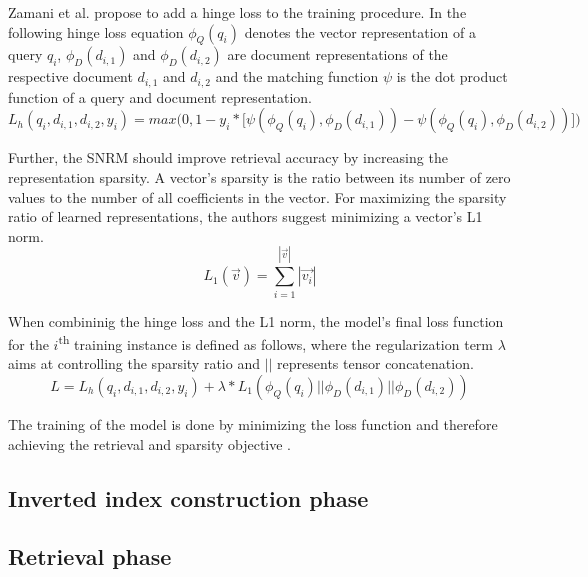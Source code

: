 Zamani et al. propose to add a hinge loss to the training procedure.
In the following hinge loss equation 
    $\phi_Q(q_i)$ denotes the vector representation of a query $q_i$,
    $\phi_D(d_{i,1})$ and $\phi_D(d_{i,2})$ are document representations 
    of the respective document $d_{i,1}$ and $d_{i,2}$ and
    the matching function $\psi$ is the dot product function of a query and 
    document representation.
\[
L_{h}(q_i, d_{i,1}, d_{i,2}, y_i) = max\bigl(0,1 - y_i * \bigl[ \psi(\phi_Q(q_i), \phi_D(d_{i,1})) - \psi(\phi_Q(q_i), \phi_D(d_{i,2})) \bigr] \bigr)
\]

Further, the SNRM should improve retrieval accuracy by increasing the representation 
    sparsity.
A vector's sparsity is the ratio between its number of zero values to 
    the number of all coefficients in the vector.
For maximizing the sparsity ratio of learned representations,
    the authors suggest minimizing a vector's L1 norm.
\[
L_1(\vec{v}) = \sum_{i=1}^{\left |  \vec{v}\right |} \left |  \vec{v_i}\right |
\]

When combininig the hinge loss and the L1 norm, the model's final loss function 
    for the $i$\textsuperscript{th} training instance is defined as follows,
    where the regularization term $\lambda$ aims at controlling the sparsity
    ratio and $||$ represents tensor concatenation.
\[
L = L_{h}(q_i, d_{i,1}, d_{i,2}, y_i) + \lambda * L_1(\phi_Q(q_i)||\phi_D(d_{i,1})||\phi_D(d_{i,2}))
\]

The training of the model is done by minimizing the loss function and therefore 
    achieving the retrieval and sparsity objective
    \cite{zamani:2018:from-neural-reranking-to-neural-ranking}.

\subsection*{Inverted index construction phase}

\subsection*{Retrieval phase}





